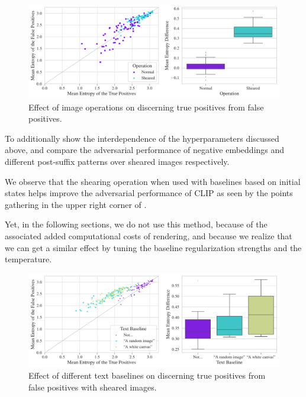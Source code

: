 \begin{figure}[H]
    \centering
    \includegraphics[width=\textwidth]{images/texturing-operations_adversarial_2.pdf}
    \caption{Effect of image operations on discerning true positives from false positives.}
    \label{fig:texturing-operations-adversarial}
\end{figure}

To additionally show the interdependence of the hyperparameters discussed above,  and  compare the adversarial performance of negative embeddings and different post-suffix patterns over sheared images respectively.

We observe that the shearing operation when used with baselines based on initial states helps improve the adversarial performance of CLIP as seen by the points gathering in the upper right corner of .

Yet, in the following sections, we do not use this method, because of the associated added computational costs of rendering, and because we realize that we can get a similar effect by tuning the baseline regularization strengths and the temperature.

\begin{figure}[H]
    \centering
    \includegraphics[width=\textwidth]{images/baseline_sheared_adversarial_2.pdf}
    \caption{Effect of different text baselines on discerning true positives from false positives with sheared images.}
    \label{fig:baseline_sheared_adversarial}
\end{figure}

